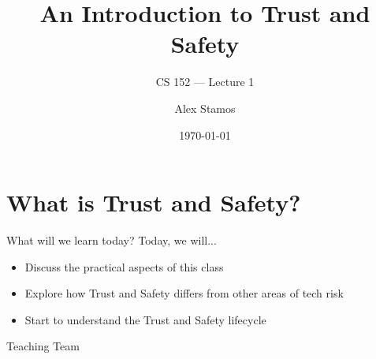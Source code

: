 \documentclass[nobackground,dvipsnames,table]{beamer}
\title{An Introduction to Trust and Safety}
\subtitle{CS 152 --- Lecture 1}
\author[A. Stamos]{Alex Stamos}
\institute[SIO]{\large Stanford Internet Observatory}
\date[2022]{\today}
\begin{document}
\begin{frame}
    \titlepage
\end{frame}

\section{What is Trust and Safety?}

\begin{frame}{What will we learn today?}
    Today, we will...
    \begin{itemize}
        \item Discuss the practical aspects of this class
        \item Explore how Trust and Safety differs from other areas of tech risk
        \item Start to understand the Trust and Safety lifecycle
    \end{itemize}
\end{frame}

\begin{frame}{} %
    \thispagestyle{empty}
    \huge
    Teaching Team
\end{frame}
\end{document}
